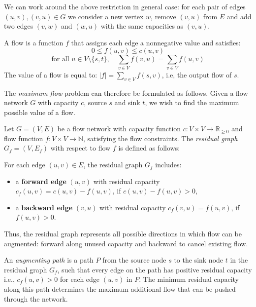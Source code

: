 We can work around the above restriction in general case: for each pair of edges $(u,v),(v,u) \in G$ we consider a new vertex $w$, remove $(v,u)$ from $E$ and add two edges $(v,w)$ and $(w,u)$ with the same capacities as $(v,u)$. 

\begin{defn}
A flow is a function $f$ that assigns each edge a nonnegative value and satisfies:
$$ 0 \leq f(u,v) \leq c(u,v)$$
$$
\text{for all } u \in V \setminus \{s, t\}, \quad
\sum_{v \in V} f(v, u) = \sum_{v \in V} f(u, v)
$$
The value of a flow is equal to: 
$|f| = \sum_{v \in V} f(s, v)$, i.e, the output flow of $s$.

\end{defn}

\begin{defn}
The \emph{maximum flow} problem can therefore be formulated as follows. Given a flow network $G$ with capacity $c$, source $s$ and sink $t$, we wish to find the maximum possible value of a flow.
\end{defn}

\begin{defn}
Let $ G = (V, E) $ be a flow network with capacity function $ c : V \times V \to \mathbb{R}_{\geq 0} $ and flow function $ f : V \times V \to \mathbb{N} $, satisfying the flow constraints. The \emph{residual graph} $ G_f = (V, E_f) $ with respect to flow $ f $ is defined as follows:

For each edge $ (u, v) \in E $, the residual graph $ G_f $ includes:
\begin{itemize}
  \item a \textbf{forward edge} $ (u, v) $ with residual capacity $ c_f(u, v) = c(u, v) - f(u, v) $, if $ c(u, v) - f(u, v) > 0 $,
  \item a \textbf{backward edge} $ (v, u) $ with residual capacity $ c_f(v, u) = f(u, v) $, if $ f(u, v) > 0 $.
\end{itemize}

Thus, the residual graph represents all possible directions in which flow can be augmented: forward along unused capacity and backward to cancel existing flow.
\end{defn}

\begin{defn}
An \emph{augmenting path} is a path $P$ from the source node $s$ to the sink node $t$ in the residual graph $G_f$, such that every edge on the path has positive residual capacity i.e., $ c_f(u, v) > 0 $ for each edge $ (u, v) $ in $P$. The minimum residual capacity along this path determines the maximum additional flow that can be pushed through the network.
\end{defn}

